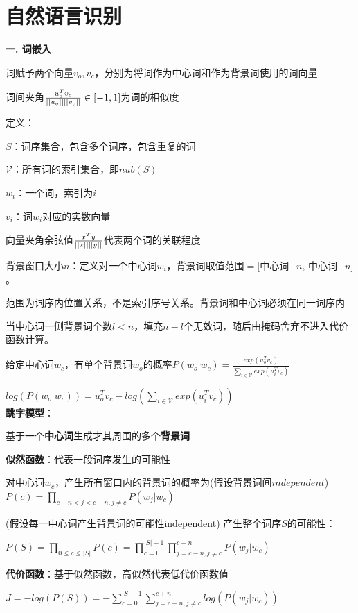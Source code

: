 \documentclass[UTF8]{ctexart}
\begin{document}
\section{自然语言识别}
\noindent \textbf{一. 词嵌入}

  词赋予两个向量$v_o, v_c$，分别为将词作为中心词和作为背景词使用的词向量
  
  \quad 词间夹角$\frac{u_o^Tv_c}{||u_o||\space||v_c||} \in [-1, 1]$为词的相似度

  定义：

  \quad $S$：词序集合，包含多个词序，包含重复的词

  \quad $\mathcal{V} $：所有词的索引集合，即$nub(S)$

  \quad $w_i$：一个词，索引为$i$

  \quad $v_i$：词$w_i$对应的实数向量
  
  \quad \quad 向量夹角余弦值$\frac{x^Ty}{||x||\space ||y||}$代表两个词的关联程度

  \quad 背景窗口大小$n$：定义对一个中心词$w_i$，背景词取值范围$=[$中心词$-n$, 中心词$+n]$。
  
  \quad \quad 范围为词序内位置关系，不是索引序号关系。背景词和中心词必须在同一词序内

  \quad \quad 当中心词一侧背景词个数$l<n$，填充$n-l$个无效词，随后由掩码舍弃不进入代价函数计算。

  给定中心词$w_c$，有单个背景词$w_o$的概率$P(w_o | w_c) = \frac{exp(u_o^Tv_c)}{\sum_{i\in\mathcal{V} } exp(u_i^Tv_c)}$
  
  \quad $ log(P(w_o | w_c)) = u_o^Tv_c - log(\sum_{i\in\mathcal{V} } exp(u_i^Tv_c))$\\
\textbf{跳字模型}：
  
  基于一个\textbf{中心词}生成才其周围的多个\textbf{背景词}

  \textbf{似然函数}：代表一段词序发生的可能性

  \quad 对中心词$w_c$，产生所有窗口内的背景词的概率为(假设背景词间$independent$)$P(c) = \prod_{c-n<j<c+n, j \neq c} P(w_j | w_c)$

  \quad (假设每一中心词产生背景词的可能性independent) 产生整个词序$S$的可能性：
  
  \quad \quad $P(S) = \prod_{0\leq c \leq |S|} P(c) = \prod_{c = 0}^{|S|-1} \prod_{j = c-n, j \neq c}^{c+n} P(w_j | w_c)$
  
  \textbf{代价函数}：基于似然函数，高似然代表低代价函数值

  \quad $J = -log(P(S)) = -\sum_{c = 0}^{|S|-1} \sum_{j = c-n, j \neq c}^{c+n} log(P(w_j | w_c))$
  
\end{document}
